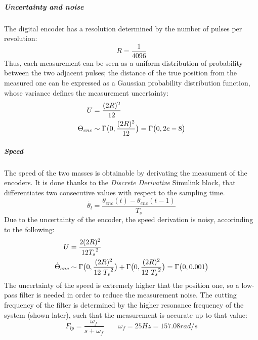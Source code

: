 \subparagraph{Uncertainty and noise}

The digital encoder has a resolution determined by the number of pulses per revolution:
\[
	R = \frac{1}{4096}
\]
Thus, each measurement can be seen as a uniform distribution of probability between the two adjacent pulses; the distance of the true position from the measured one can be expressed as a Gaussian probability distribution function, whose variance defines the measurement uncertainty:
\begin{align*}
	U &= \frac{(2R)^2}{12} \\
	\Theta_{enc} &\sim \Gamma \bigl{(} 0,\frac{(2R)^2}{12} \bigr{)} = \Gamma \bigl{(} 0, 2e-8 \bigr{)}
\end{align*}

\subparagraph{Speed}

The speed of the two masses is obtainable by derivating the measument of the encoders. It is done thanks to the \textit{Discrete Derivative} Simulink block, that differentiates two consecutive values with respect to the sampling time.
\[
	\dot{\theta_l} = \frac{ \theta_{enc}(t) - \theta_{enc}(t-1)}{T_s}
\]
Due to the uncertainty of the encoder, the speed derivation is noisy, accorinding to the following:
\begin{align*}
	U &= \frac{2(2R)^2}{12 {T_s}^2 } \\
	\dot{\Theta}_{enc}	&\sim \Gamma \bigl{(} 0,\frac{(2R)^2}{12 \ {T_s}^2} \bigr{)} + \Gamma \bigl{(} 0,\frac{(2R)^2}{12 \ {T_s}^2} \bigr{)} = \Gamma \bigl{(} 0, 0.001 \bigr{)}
\end{align*}
The uncertainty of the speed is extremely higher that the position one, so a low-pass filter is needed in order to reduce the measurement noise. The cutting frequency of the filter is determined by the higher resonance frequency of the system (shown later), such that the measurement is accurate up to that value:
\[
	F_{lp} = \frac{ \omega_f }{ s+\omega_f} \qquad \omega_f=25Hz=157.08 rad/s
\]